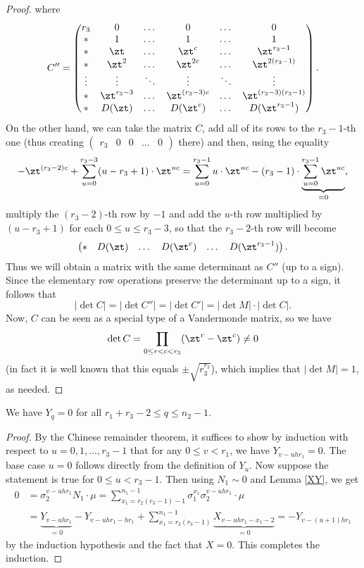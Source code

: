 \begin{proof}
where
$$C''=
\begin{pmatrix}
r_3& 0& \dots & 0 & \dots & 0\\ 
*& 1& \dots & 1 & \dots & 1\\ 
*& \zt& \dots & \zt^c & \dots & \zt^{r_3-1}\\ 
*& \zt^2& \dots & \zt^{2c} & \dots & \zt^{2(r_3-1)}\\ 
\vdots& \vdots&\ddots  & \vdots & \ddots & \vdots\\ 
*& \zt^{r_3-3}& \dots & \zt^{(r_3-3)c} & \dots & \zt^{(r_3-3)(r_3-1)}\\ 
*& D(\zt)& \dots & D(\zt^c) & \dots & D(\zt^{r_3-1})\\ 
\end{pmatrix}.
$$
On the other hand, we can take the matrix $C$, add all of its rows to the $r_3-1$-th one (thus creating $\begin{pmatrix}
r_3 & 0 & 0& \dots &0
\end{pmatrix}$
there) and then, using the equality
$$-\zt^{(r_3-2)c}+\sum_{u=0}^{r_3-3}(u-r_3+1)\cdot\zt^{uc}=\sum_{u=0}^{r_3-1}u\cdot\zt^{uc}-(r_3-1)\cdot\underbrace{\sum_{u=0}^{r_3-1}\zt^{uc}}_{=0},$$ 
multiply the $(r_3-2)$-th row by $-1$ and add the $u$-th row multiplied by $(u-r_3+1)$ for each $0\le u \le r_3-3$,
so that the $r_3-2$-th row will become
$$\begin{pmatrix}
*& D(\zt)& \dots & D(\zt^c) & \dots & D(\zt^{r_3-1})
\end{pmatrix}.$$
Thus we will obtain a matrix with the same determinant as $C''$ (up to a sign). Since the elementary row operations preserve the determinant up to a sign, it follows that
$$|\det C|=|\det C''|=|\det C'|=|\det M|\cdot |\det C|.$$ 
Now, $C$ can be seen as a special type of a Vandermonde matrix, so we have $$\det C=\prod_{0\leq r<c<r_3}(\zt^r-\zt^c)\neq 0$$
(in fact it is well known that this equals $\pm \sqrt{r_3^{r_3}}$), which implies that %
 $|\det M|=1$, as needed.
\end{proof}

\begin{cor}
We have $Y_q=0$ for all $r_1+r_3-2\leq q\leq n_2-1$.
\end{cor}
\begin{proof}
By the Chinese remainder theorem, it suffices to show by induction with respect to $u=0,1,\dots,r_3-1$ that for any $0\leq v<r_1$, we have $Y_{v-uhr_1}=0.$ The base case $u=0$ follows directly from the definition of $Y_u$. Now suppose the statement is true for $0\leq u<r_3-1$. Then using $N_1\sim 0$ and Lemma \ref{XY}, we get
\begin{align*}
0&=\sigma_2^{v-uhr_1} N_1 \cdot \mu=\sum_{x_1=r_2(r_3-1)-1}^{n_1-1}\sigma_1^{x_1}\sigma_2^{v-uhr_1}\cdot\mu\\
&=\underbrace{Y_{v-uhr_1}}_{=0}-Y_{v-uhr_1-hr_1}+\sum_{x_1=r_2(r_3-1)}^{n_1-1}\underbrace {X_{v-uhr_1-x_1-2}}_{=0}=-Y_{v-(u+1)hr_1}
\end{align*}
by the induction hypothesis and the fact that $X=0$. This completes the induction.
\end{proof}


